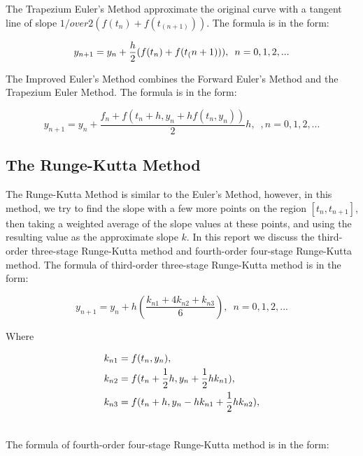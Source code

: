 \documentclass[a4paper]{article}
\begin{document}
	The Trapezium Euler’s Method approximate the original curve with a tangent line of slope ${1/over2}(f(t_n )+f(t_(n+1)))$. The formula is in the form:
	
		\begin{equation}\label{eq.1}
		y_{n+1} = y_n + {h\over2}(f(t_n )+f(t_(n+1))), \enspace n = 0,1,2,...
	\end{equation}
	
	The Improved Euler’s Method combines the Forward Euler’s Method and the Trapezium Euler Method. The formula is in the form:
	
	\begin{equation}\label{eq.3}
		y_{n+1} = y_n + \frac{f_n + f(t_n + h, y_n + hf(t_n, y_n))}{2}h, \enspace, n = 0,1,2,...
	\end{equation}	

	
	\subsection{The Runge-Kutta Method}
	
	The Runge-Kutta Method is similar to the Euler’s Method, however, in this method, we try to find the slope with a few more points on the region $[t_n, t_{n+1}]$, then taking a weighted average of the slope values at these points, and using the resulting value as the approximate slope $k$.
	In this report we discuss the third-order three-stage Runge-Kutta method and fourth-order four-stage Runge-Kutta method. The formula of third-order three-stage Runge-Kutta method is in the form:
	
	\begin{equation}\label{eq.4}
		y_{n+1} = y_n + h(\frac{k_{n1} + 4k_{n2} + k_{n3} }{6}), \enspace n = 0, 1, 2,...
	\end{equation}

	Where
	
	\begin{align} \nonumber
		k_{n1} &= f(t_n, y_n), \\ \nonumber
		k_{n2} &= f(t_n + {1 \over 2}h, y_n + {1 \over 2}hk_{n1}), \\ \nonumber
		k_{n3} &= f(t_n + h, y_n - hk_{n1} + {1 \over 2}hk_{n2}), \\ \nonumber
	\end{align}
	
	The formula of fourth-order four-stage Runge-Kutta method is in the form:
	
\end{document}
